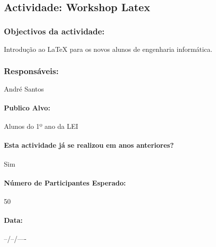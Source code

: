 \subsection{Actividade: Workshop Latex} %

\subsubsection*{Objectivos da actividade:}
Introdução ao LaTeX para os novos alunos de engenharia informática.

\subsubsection*{Responsáveis:}
\begin{itemizedash}
	\item{André Santos}
\end{itemizedash}

\paragraph{Publico Alvo: }
Alunos do 1º ano da LEI

\paragraph{Esta actividade já se realizou em anos anteriores?}
Sim

\paragraph{Número de Participantes Esperado:}
50

\paragraph{Data:} --/--/----

\vspace{20pt}
